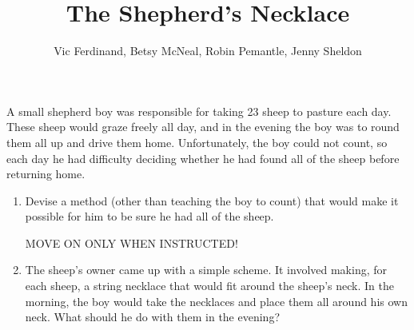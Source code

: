 \documentclass[handout]{ximera}
\title{The Shepherd's Necklace}
\author{Vic Ferdinand, Betsy McNeal, Robin Pemantle, Jenny Sheldon}
\begin{document}
\begin{abstract}\end{abstract}
\maketitle




\begin{problem} 
A small shepherd boy was responsible for taking 23 sheep to pasture each day.  These sheep would graze freely all day, and in the evening the boy was to round them all up and drive them home.  Unfortunately, the boy could not count, so each day he had difficulty deciding whether he had found all of the sheep before returning home. 

\begin{enumerate}

\item	Devise a method (other than teaching the boy to count) that would make it possible for him to be sure he had all of the sheep.

\vfill


\vfill


MOVE ON ONLY WHEN INSTRUCTED!

\newpage
\item 	The sheep's owner came up with a simple scheme.  It involved making, for each sheep, a string necklace that would fit around the sheep's neck.  In the morning, the boy would take the necklaces and place them all around his own neck.  What should he do with them in the evening?


\end{enumerate}
\end{problem}
\end{document}
